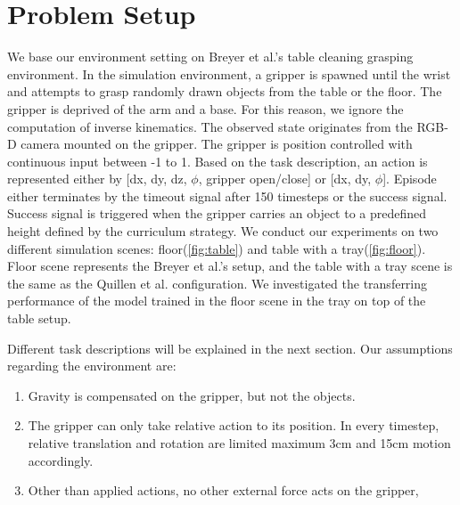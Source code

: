 \section{Problem Setup}

We base our environment setting on Breyer et al.’s table cleaning grasping environment. In the simulation environment, a gripper is spawned until the wrist and attempts to grasp randomly drawn objects from the table or the floor. The gripper is deprived of the arm and a base. For this reason, we ignore the computation of inverse kinematics.
The observed state originates from the RGB-D camera mounted on the gripper. The gripper is position controlled with continuous input between -1 to 1. Based on the task description, an action is represented either by [dx, dy, dz, \(\phi\), gripper open/close] or [dx, dy, \(\phi\)]. 
Episode either terminates by the timeout signal after 150 timesteps or the success signal. Success signal is triggered when the gripper carries an object to a predefined height defined by the curriculum strategy.
We conduct our experiments on two different simulation scenes: floor(\ref{fig:table}) and table with a tray(\ref{fig:floor}). Floor scene represents the Breyer et al.’s setup, and the table with a tray scene is the same as the Quillen et al. configuration. We investigated the transferring performance of the model trained in the floor scene in the tray on top of the table setup.

Different task descriptions will be explained in the next section. Our assumptions regarding the environment are:

\begin{enumerate}
    \item Gravity is compensated on the gripper, but not the objects.
    \item The gripper can only take relative action to its position. In every timestep, relative translation and rotation are limited maximum 3cm and 15cm motion accordingly.
    \item Other than applied actions, no other external force acts on the gripper, 
\end{enumerate}

